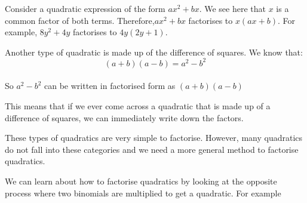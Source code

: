 Consider a quadratic expression of the form $a{x}^{2}+bx$. We see here that $x$ is a common factor of both terms. Therefore,$a{x}^{2}+bx$ factorises to $x(ax+b)$. For example, $8{y}^{2}+4y$ factorises to $4y(2y+1)$.\par 
Another type of quadratic is made up of the difference of squares. We know that:
\begin{equation*}
(a+b)(a-b)={a}^{2}-{b}^{2}
\end{equation*}
\\ 
So $a^2-b^2$ can be written in factorised form as $(a+b)(a-b)$ \par

This means that if we ever come across a quadratic that is made up of a difference of squares, we can immediately write down the factors. 


These types of quadratics are very simple to factorise. However, many quadratics do not fall into these categories and we need a more general method to factorise quadratics.
\par 
We can learn about how to factorise quadratics by looking at the opposite process where two binomials are multiplied to get a quadratic. For example

